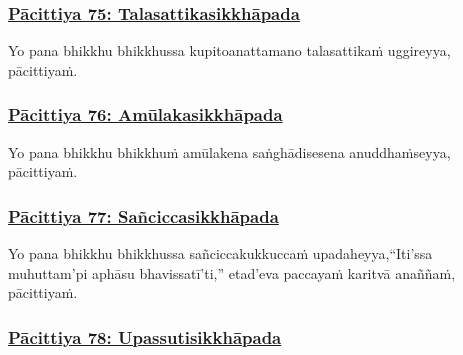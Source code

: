 \subsubsection*{\hyperref[exp75]{Pācittiya 75: Talasattikasikkhāpada}}
\label{pac75}

Yo pana bhikkhu bhikkhussa kupito\makeatletter\hyperlink{endnote401-appendix}\makeatother \thinspace anattamano talasattikaṁ uggireyya, pācittiyaṁ.



\subsubsection*{\hyperref[exp76]{Pācittiya 76: Amūlakasikkhāpada}}
\label{pac76}

Yo pana bhikkhu bhikkhuṁ amūlakena saṅghādisesena anuddhaṁseyya, pācittiyaṁ.



\subsubsection*{\hyperref[exp77]{Pācittiya 77: Sañciccasikkhāpada}}
\label{pac77}

Yo pana bhikkhu bhikkhussa sañcicca\makeatletter\hyperlink{endnote402-appendix}\makeatother \thinspace kukkuccaṁ upadaheyya,\makeatletter\hyperlink{endnote403-appendix}\makeatother \thinspace ``Iti'ssa muhuttam'pi aphāsu bhavissatī'ti,'' etad'eva paccayaṁ karitvā anaññaṁ, pācittiyaṁ.



\subsubsection*{\hyperref[exp78]{Pācittiya 78: Upassutisikkhāpada}}
\label{pac78}

